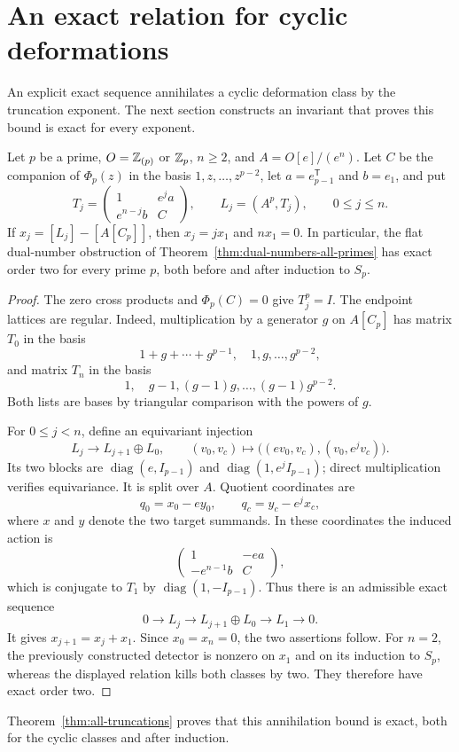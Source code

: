 \section{An exact relation for cyclic deformations}
\label{sec:uniform-torsion}

An explicit exact sequence annihilates a cyclic deformation class by
the truncation exponent.  The next section constructs an invariant
that proves this bound is exact for every exponent.

\begin{proposition}\label{prop:truncation-torsion}
Let $p$ be a prime, $O=\mathbb Z_{(p)}$ or $\mathbb Z_p$, $n\geq2$, and
$A=O[e]/(e^n)$.
Let $C$ be the companion of $\Phi_p(z)$ in the basis
$1,z,\ldots,z^{p-2}$, let $a=e_{p-1}^{\mathsf T}$ and $b=e_1$, and put
\[
 T_j=\begin{pmatrix}1&e^j a\\e^{n-j}b&C\end{pmatrix},
 \qquad L_j=(A^p,T_j),\qquad 0\leq j\leq n.
\]
If $x_j=[L_j]-[A[C_p]]$, then $x_j=jx_1$ and $nx_1=0$.
In particular, the flat dual-number obstruction of
Theorem~\ref{thm:dual-numbers-all-primes} has exact order two for every
prime $p$, both before and after induction to $S_p$.
\end{proposition}

\begin{proof}
The zero cross products and $\Phi_p(C)=0$ give $T_j^p=I$.
The endpoint lattices are regular.  Indeed, multiplication by a
generator $g$ on $A[C_p]$ has matrix $T_0$ in the basis
\[
 1+g+\cdots+g^{p-1},\quad 1,g,\ldots,g^{p-2},
\]
and matrix $T_n$ in the basis
\[
 1,\quad g-1,(g-1)g,\ldots,(g-1)g^{p-2}.
\]
Both lists are bases by triangular comparison with the powers of $g$.

For $0\leq j<n$, define an equivariant injection
\[
 L_j\longrightarrow L_{j+1}\oplus L_0,\qquad
 (v_0,v_c)\longmapsto
 \bigl((ev_0,v_c),(v_0,e^jv_c)\bigr).
\]
Its two blocks are $\operatorname{diag}(e,I_{p-1})$ and
$\operatorname{diag}(1,e^jI_{p-1})$; direct multiplication verifies
equivariance.  It is split over $A$.  Quotient coordinates are
\[
 q_0=x_0-ey_0,\qquad q_c=y_c-e^jx_c,
\]
where $x$ and $y$ denote the two target summands.  In these coordinates
the induced action is
\[
 \begin{pmatrix}1&-e a\\-e^{n-1}b&C\end{pmatrix},
\]
which is conjugate to $T_1$ by $\operatorname{diag}(1,-I_{p-1})$.
Thus there is an admissible exact sequence
\[
 0\longrightarrow L_j\longrightarrow L_{j+1}\oplus L_0
   \longrightarrow L_1\longrightarrow0.
\]
It gives $x_{j+1}=x_j+x_1$.  Since $x_0=x_n=0$, the two assertions
follow.  For $n=2$, the previously constructed detector is nonzero
on $x_1$ and on its induction to $S_p$, whereas the displayed relation
kills both classes by two.  They therefore have exact order two.
\end{proof}

Theorem~\ref{thm:all-truncations} proves that this annihilation bound
is exact, both for the cyclic classes and after induction.
